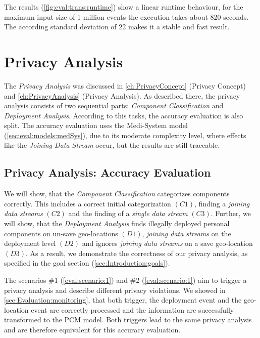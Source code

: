 The results (\autoref{fig:eval:trans:runtime}) show a linear runtime behaviour, for the maximum input size of 1 million events the execution takes about 820 seconds. The according standard deviation of 22 makes it a stable and fast result.

\section{Privacy Analysis}
\label{sec:Evaluation:privacyanalysis}

The \textit{Privacy Analysis} was discussed in \autoref{ch:PrivacyConcept} (Privacy Concept) and \autoref{ch:PrivacyAnalysis} (Privacy Analysis). As described there, the privacy analysis consists of two sequential parts: \textit{Component Classification} and \textit{Deployment Analysis}. According to this tasks, the accuracy evaluation is also split. The accuracy evaluation uses the Medi-System model (\autoref{sec:eval:models:medSys}), due to its moderate complexity level, where effects like the \textit{Joining Data Stream} occur, but the results are still traceable.

\subsection{Privacy Analysis: Accuracy Evaluation}

We will show, that the \textit{Component Classification} categorizes components correctly. This includes a correct initial categorization $(C1)$, finding a \textit{joining data streams} $(C2)$ and the finding of a \textit{single data stream} $(C3)$. Further, we will show, that the \textit{Deployment Analysis} finds illegally deployed personal components on un-save geo-locations $(D1)$, \textit{joining data streams} on the deployment level $(D2)$ and ignores \textit{joining data streams} on a save geo-location $(D3)$. As a result, we demonstrate the correctness of our privacy analysis, as specified in the goal section (\autoref{sec:Introduction:goals}).

The scenarios \#1 (\autoref{eval:scenario:1}) and \#2 (\autoref{eval:scenario:1}) aim to trigger a privacy analysis and describe different privacy violations. We showed in \autoref{sec:Evaluation:monitoring}, that both trigger, the deployment event and the geo-location event are correctly processed and the information are successfully transformed to the PCM model. Both triggers lead to the same privacy analysis and are therefore equivalent for this accuracy evaluation. 

